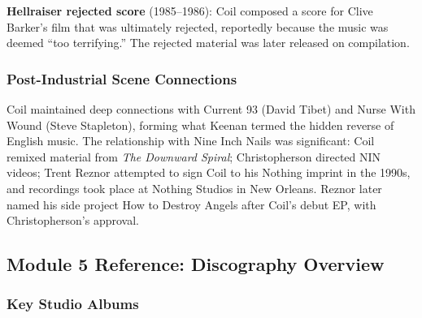 \documentclass[11pt,letterpaper]{article}
\begin{document}
\textbf{Hellraiser rejected score} (1985--1986): Coil composed a score for Clive Barker's film that was ultimately rejected, reportedly because the music was deemed ``too terrifying.'' The rejected material was later released on compilation.

\subsubsection{Post-Industrial Scene Connections}

Coil maintained deep connections with Current 93 (David Tibet) and Nurse With Wound (Steve Stapleton), forming what Keenan termed the hidden reverse of English music. The relationship with Nine Inch Nails was significant: Coil remixed material from \textit{The Downward Spiral}; Christopherson directed NIN videos; Trent Reznor attempted to sign Coil to his Nothing imprint in the 1990s, and recordings took place at Nothing Studios in New Orleans. Reznor later named his side project How to Destroy Angels after Coil's debut EP, with Christopherson's approval.

\subsection{Module 5 Reference: Discography Overview}

\subsubsection{Key Studio Albums}
\end{document}
